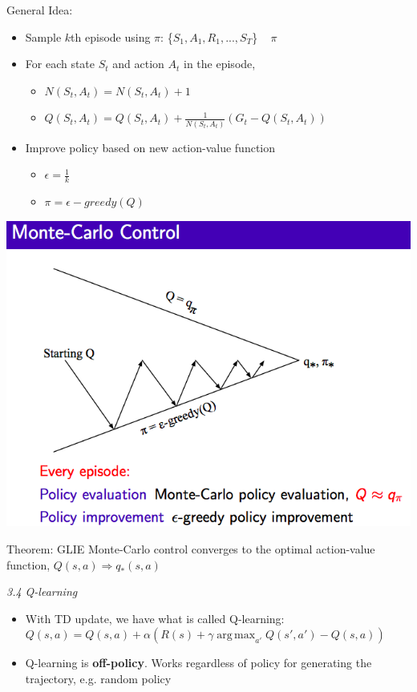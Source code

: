 \documentclass[12pt]{article}
\begin{document}
\noindent
General Idea:
\begin{itemize}
\item Sample $k$th episode using $\pi$: \{$S_1, A_1, R_1, ..., S_T$\} ~ $\pi$
\item For each state $S_t$ and action $A_t$ in the episode, 
\begin{itemize}
\item $N(S_t, A_t) = N(S_t, A_t)+1$
\item $Q(S_t, A_t) = Q(S_t, A_t) + \frac{1}{N(S_t, A_t)}(G_t - Q(S_t, A_t))$
\end{itemize}
\item Improve policy based on new action-value function
\begin{itemize}
\item $\epsilon = \frac{1}{k}$
\item $\pi =\epsilon-greedy(Q) $
\end{itemize}
\end{itemize}
\includegraphics[scale=0.35]{mc2}\\

 \begin{tcolorbox}
Theorem: GLIE Monte-Carlo control converges to the optimal action-value function, $Q(s, a) \Rightarrow q_*(s, a) $
 \end{tcolorbox}
 

\noindent
\textsl{3.4 Q-learning}
\begin{itemize}
\item With TD update, we have what is called Q-learning:\\
$Q(s, a) = Q(s, a) + \alpha(R(s) + \gamma \operatorname*{arg\,max}_{a'}{Q(s', a')} - Q(s, a))$
\item Q-learning is \textbf{off-policy}. Works regardless of policy for generating the trajectory, e.g. random policy
\end{itemize}
\end{document}
